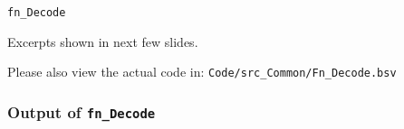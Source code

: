 
\begin{frame}

\begin{center}
  {\LARGE\tt fn\_Decode}

  \vspace{5ex}

  Excerpts shown in next few slides.

  Please also view the actual code in:
  {\tt Code/src\_Common/Fn\_Decode.bsv}

\end{center}

\end{frame}


\begin{frame}[fragile]
\frametitle{Output of {\tt fn\_Decode}}

\footnotesize


\end{frame}


